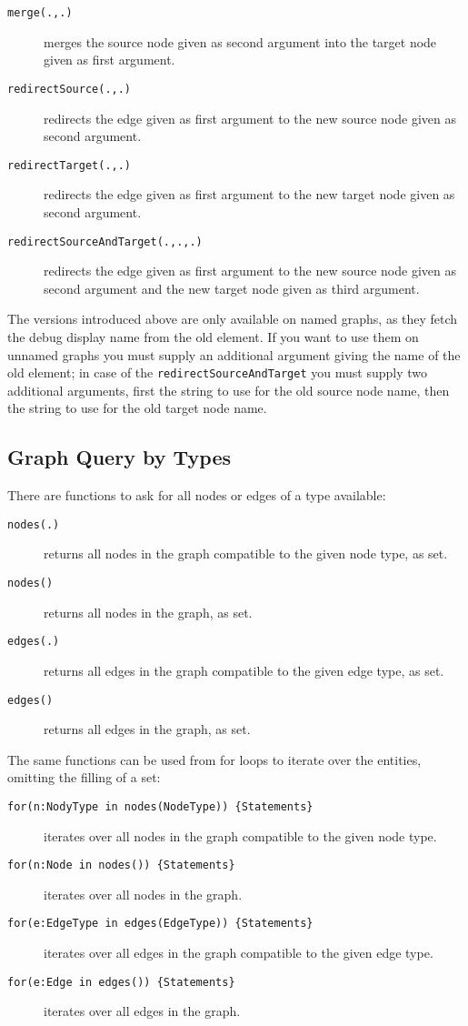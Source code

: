 \begin{description}
\item[\texttt{merge(.,.)}] merges the source node given as second argument into the target node given as first argument.
\item[\texttt{redirectSource(.,.)}] redirects the edge given as first argument to the new source node given as second argument.
\item[\texttt{redirectTarget(.,.)}] redirects the edge given as first argument to the new target node given as second argument.
\item[\texttt{redirectSourceAndTarget(.,.,.)}] redirects the edge given as first argument to the new source node given as second argument and the new target node given as third argument.
\end{description}

The versions introduced above are only available on named graphs, as they fetch the debug display name from the old element.
If you want to use them on unnamed graphs you must supply an additional argument giving the name of the old element; in case of the \texttt{redirectSourceAndTarget} you must supply two additional arguments, first the string to use for the old source node name, then the string to use for the old target node name.

\subsection{Graph Query by Types}

There are functions to ask for all nodes or edges of a type available: 
\begin{description}
\item[\texttt{nodes(.)}] returns all nodes in the graph compatible to the given node type, as set.
\item[\texttt{nodes()}] returns all nodes in the graph, as set.
\item[\texttt{edges(.)}] returns all edges in the graph compatible to the given edge type, as set.
\item[\texttt{edges()}] returns all edges in the graph, as set.
\end{description}

The same functions can be used from for loops to iterate over the entities, omitting the filling of a set: 
\begin{description}
\item[\texttt{for(n:NodyType in nodes(NodeType)) \{Statements\}} ] iterates over all nodes in the graph compatible to the given node type.
\item[\texttt{for(n:Node in nodes()) \{Statements\}} ] iterates over all nodes in the graph.
\item[\texttt{for(e:EdgeType in edges(EdgeType)) \{Statements\}} ] iterates over all edges in the graph compatible to the given edge type.
\item[\texttt{for(e:Edge in edges()) \{Statements\}} ] iterates over all edges in the graph.
\end{description}

